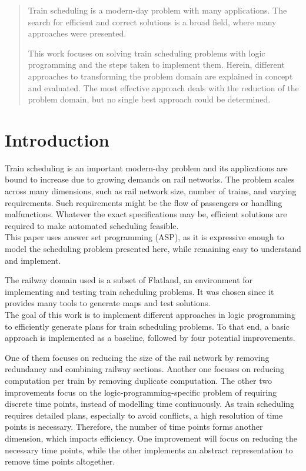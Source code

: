 \documentclass{llncs}
\begin{document}
\begin{multicols*}{2}
\begin{abstract}
Train scheduling is a modern-day problem with many applications. The search for efficient and correct solutions is a broad field, where many approaches were presented.

This work focuses on solving train scheduling problems with logic programming and the steps taken to implement them. Herein, different approaches to transforming the problem domain are explained in concept and evaluated. The most effective approach deals with the reduction of the problem domain, but no single best approach could be determined.
\end{abstract}

\section*{Introduction}
Train scheduling is an important modern-day problem and its applications are bound to increase due to growing demands on rail networks. The problem scales across many dimensions, such as rail network size, number of trains, and varying requirements. Such requirements might be the flow of passengers or handling malfunctions. Whatever the exact specifications may be, efficient solutions are required to make automated scheduling feasible.\\

This paper uses answer set programming (ASP), as it is expressive enough to model the scheduling problem presented here, while remaining easy to understand and implement.

The railway domain used is a subset of Flatland, an environment for implementing and testing train scheduling problems. It was chosen since it provides many tools to generate maps and test solutions.\\

The goal of this work is to implement different approaches in logic programming to efficiently generate plans for train scheduling problems. To that end, a basic approach is implemented as a baseline, followed by four potential improvements.

One of them focuses on reducing the size of the rail network by removing redundancy and combining railway sections. Another one focuses on reducing computation per train by removing duplicate computation. The other two improvements focus on the logic-programming-specific problem of requiring discrete time points, instead of modelling time continuously. As train scheduling requires detailed plans, especially to avoid conflicts, a high resolution of time points is necessary. Therefore, the number of time points forms another dimension, which impacts efficiency. One improvement will focus on reducing the necessary time points, while the other implements an abstract representation to remove time points altogether.\\


\end{multicols*}
\end{document}
